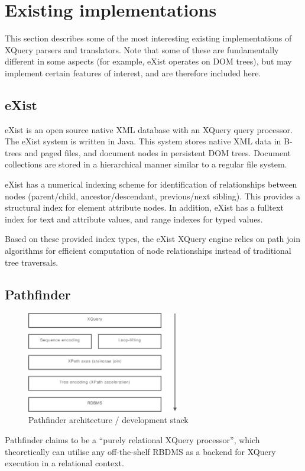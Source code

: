 \section{Existing implementations}
\label{sect:existing_implementations}

This section describes some of the most interesting existing implementations of
XQuery parsers and translators. Note that some of these are fundamentally
different in some aspects (for example, eXist operates on DOM trees), but may
implement certain features of interest, and are therefore included here.

\subsection{eXist}
eXist\cite{exist_doc} is an open source native XML database with an XQuery
query processor. The eXist system is written in Java. This system stores native
XML data in B-trees and paged files, and document nodes
in persistent DOM trees\cite{exist_factsheet}. Document collections are stored
in a hierarchical manner similar to a regular file system.

eXist has a numerical indexing scheme for identification of relationships
between nodes (parent/child, ancestor/descendant, previous/next sibling). This
provides a structural index for element attribute nodes. In addition, eXist has
a fulltext index for text and attribute values, and range indexes for typed
values.

Based on these provided index types, the eXist XQuery engine relies on path
join algorithms\cite{exist_idx_drv_query} for efficient computation of node
relationships instead of traditional tree traversals. 

\subsection{Pathfinder}
\label{sect:theory:pathfinder}
\begin{figure}[h]
  \centering
    \includegraphics[width=0.6\textwidth]{diagrams/pathfinder_arch}
  \caption{Pathfinder architecture / development stack}
\end{figure}
Pathfinder\cite{pathfinderHome} claims to be a ``purely relational XQuery
processor'', which theoretically can utilise any off-the-shelf RBDMS as a
backend for XQuery execution in a relational context.

